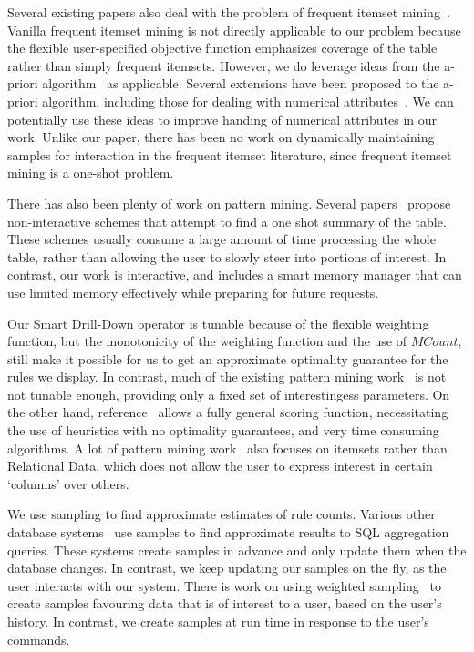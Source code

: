 \documentclass[10pt,journal,compsoc]{IEEEtran}
\newcounter{prob}
\begin{document}
Several existing papers also deal with the problem of frequent itemset mining~\cite{apriori, 1411744, Han:2000:MFP:342009.335372}. Vanilla frequent itemset mining is not directly applicable to our problem because the flexible user-specified objective function emphasizes coverage of the table rather than simply frequent itemsets.  However, we do leverage ideas from the a-priori algorithm~\cite{apriori} as applicable. Several extensions have been proposed to the a-priori algorithm, including those for dealing with numerical attributes~\cite{Srikant:1996:MQA:233269.233311, Miller:1997:ARO:253260.253361}. We can potentially use these ideas to improve handing of numerical attributes in our work. Unlike our paper, there has been no work on dynamically maintaining samples for interaction in the frequent itemset literature, since frequent itemset mining is a one-shot problem.

There has also been plenty of work on pattern mining. Several papers~\cite{Vreeken:2011:KMI:1969593.1969615,Bringmann:2007:ICDM,Yan:2005:SIP:1081870.1081907} propose non-interactive schemes that attempt to find a one shot summary of the table. These schemes usually consume a large amount of time processing the whole table, rather than allowing the user to slowly steer into portions of interest. In contrast, our work is interactive, and includes a smart memory manager that can use limited memory effectively while preparing for future requests.

Our Smart Drill-Down operator is tunable because of the flexible weighting function, but the monotonicity of the weighting function and the use of $MCount$, still make it possible for us to get an approximate optimality guarantee for the rules we display. In contrast, much of the existing pattern mining work~\cite{Goethals:2011:MFI:2020408.2020529,Tatti:2014:FRI:2676651.2656261,DeBie:2010:FMI:1816112.1816117} is not not tunable enough, providing only a fixed set of interestingess parameters. On the other hand, reference~\cite{Leeuwen:2012:DSS:2347179.2347243} allows a fully general scoring function, necessitating the use of heuristics with no optimality guarantees, and very time consuming algorithms. 
A lot of pattern mining work~\cite{Goethals:2011:MFI:2020408.2020529,Yan:2005:SIP:1081870.1081907,Vreeken:2011:KMI:1969593.1969615} also focuses on itemsets rather than Relational Data, which does not allow the user to express interest in certain `columns' over others.

We use sampling to find approximate estimates of rule counts. Various other database systems~\cite{Acharya:1999:AAQ:304182.304581, Agarwal:2013:BQB:2465351.2465355} use samples to find approximate results to SQL aggregation queries. These systems create samples in advance and only update them when the database changes. In contrast, we keep updating our samples on the fly, as the user interacts with our system. There is work on using weighted sampling~\cite{6691587} to create samples favouring data that is of interest to a user, based on the user's history. In contrast, we create samples at run time in response to the user's commands.
\end{document}
